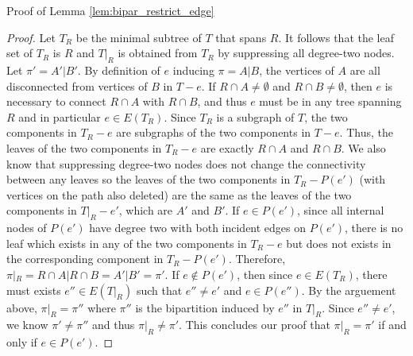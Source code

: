 \documentclass{article}
\begin{document}
Proof of Lemma \ref{lem:bipar_restrict_edge}
\begin{proof}
Let $T_R$ be the minimal subtree of $T$ that spans $R$. It follows that the leaf set of $T_R$ is $R$ and $T|_R$ is obtained from $T_R$ by suppressing all degree-two nodes. Let $\pi' = A'|B'$.
By definition of $e$ inducing $\pi = A|B$, the vertices of $A$ are all disconnected from vertices of $B$ in $T-e$. If $R\cap A \neq \emptyset$ and $R\cap B \neq \emptyset$, then $e$ is necessary to connect $R\cap A$ with $R \cap B$, and thus $e$ must be in any tree spanning $R$ and in particular $e \in E(T_R)$. Since $T_R$ is a subgraph of $T$, the two components in $T_R-e$ are subgraphs of the two components in $T-e$. Thus, the leaves of the two components in $T_R-e$ are exactly $R\cap A$ and $R\cap B$. We also know that suppressing degree-two nodes does not change the connectivity between any leaves so the leaves of the two components in $T_R - P(e')$ (with vertices on the path also deleted) are the same as the leaves of the two components in $T|_R - e'$, which are $A'$ and $B'$. If $e \in P(e')$, since all internal nodes of $P(e')$ have degree two with both incident edges on $P(e')$, there is no leaf which exists in any of the two components in $T_R - e$ but does not exists in the corresponding component in $T_R-P(e')$. Therefore, $\pi|_R = R\cap A|R\cap B = A'|B' = \pi'$. If $e \notin P(e')$, then since $e \in E(T_R)$, there must exists $e'' \in E(T|_R)$ such that $e'' \neq e'$ and $e \in P(e'')$. By the arguement above, $\pi|_R = \pi''$ where $\pi''$ is the bipartition induced by $e''$ in $T|_R$. Since $e'' \neq e'$, we know $\pi' \neq \pi''$ and thus $\pi|_R \neq \pi'$. This concludes our proof that $\pi|_R = \pi'$ if and only if $e \in P(e')$. 
\end{proof}



\end{document}
